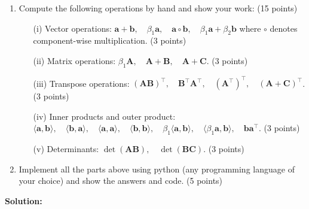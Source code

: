 \documentclass[11pt,letterpaper]{article}
\begin{document}
\begin{enumerate}
\begin{enumerate}
\item Compute the following operations by hand and show your work: (15 points)
\begin{enumerate}
    \item [(i)] Vector operations:
    $\mathbf{a} + \mathbf{b}, \quad \beta_1 \mathbf{a}, \quad \mathbf{a} \circ \mathbf{b}, \quad \beta_1 \mathbf{a} + \beta_2 \mathbf{b}$
    where $\circ$ denotes component-wise multiplication. (3 points)
    
    \item [(ii)] Matrix operations: $\beta_1 \mathbf{A}, \quad \mathbf{A} + \mathbf{B}, \quad \mathbf{A} + \mathbf{C}$. (3 points)
    
    \item [(iii)] Transpose operations: $(\mathbf{AB})^\top, \quad \mathbf{B}^\top \mathbf{A}^\top, \quad (\mathbf{A}^{\top})^{\top}, \quad (\mathbf{A} + \mathbf{C})^\top$. (3 points)
    
    \item [(iv)] Inner products and outer product: $\langle \mathbf{a}, \mathbf{b} \rangle, \quad \langle \mathbf{b}, \mathbf{a} \rangle, \quad \langle \mathbf{a}, \mathbf{a} \rangle, \quad \langle \mathbf{b}, \mathbf{b} \rangle, \quad \beta_1 \langle \mathbf{a}, \mathbf{b} \rangle, \quad \langle \beta_1 \mathbf{a}, \mathbf{b} \rangle, \quad \mathbf{b} \mathbf{a}^\top $. (3 points)
    
    \item [(v)] Determinants: $\det(\mathbf{AB}), \quad \det(\mathbf{BC})$. (3 points)
\end{enumerate}
\item Implement all the parts above using python (any programming language of your choice)  and show the answers and code. (5 points)
\end{enumerate}

\textbf{Solution:}


\end{enumerate}
\end{document}
